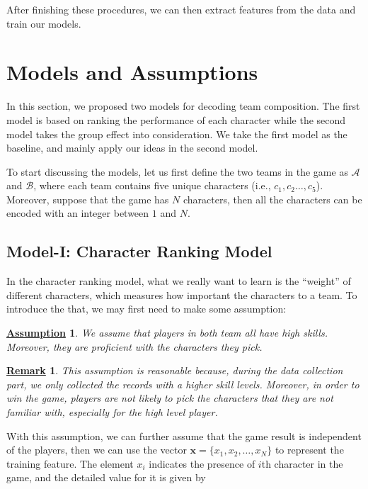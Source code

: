 \documentclass{article} %
\newtheorem{assumption}{\underline{Assumption}}
\newtheorem{remark}{\underline{Remark}}
\begin{document}
After finishing these procedures, we can then extract features from the data and train our models.





\section{Models and Assumptions}

In this section, we proposed two models for decoding team composition. The first model is based on ranking the performance of each character while the second model takes the group effect into consideration. We take the first model as the baseline, and mainly apply our ideas in the second model.


To start discussing the models,  let us first define the two teams in the game as $\mathcal{A}$ and $\mathcal{B}$, where each team contains five unique characters (i.e., $c_1,c_2\ldots,c_5$). Moreover, suppose that the game has $N$ characters, then all the characters can be encoded with an integer between $1$ and $N$.

\subsection{Model-I: Character Ranking Model}

In the character ranking model, what we really want to learn is the ``weight'' of different characters, which measures how important the characters to a team. To introduce the that, we may first need to make some assumption:

\begin{assumption}
We assume that players in both team all have high skills. Moreover, they are proficient with the characters they pick.
\end{assumption}

\begin{remark}
This assumption is reasonable because, during the data collection part, we only collected the records with a higher skill levels. Moreover, in order to win the game, players are not likely to pick the characters that they are not familiar with, especially for the high level player.
\end{remark}

With this assumption, we can further assume that the game result is independent of the players, then we can use the vector $\textbf{x}=\{x_1,x_2,\ldots,x_N\}$ to represent the training feature. The element $x_i$ indicates the presence of $i$th character in the game, and the detailed value for it is given by
\end{document}
